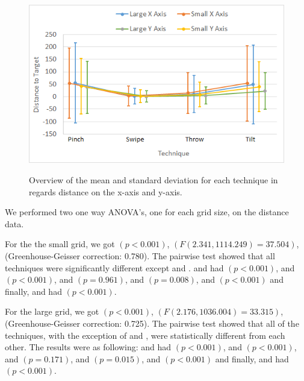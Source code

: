 \begin{figure}[H]
	{\includegraphics[width = 1\columnwidth ]{images/distance_axis.png}} 
	\caption{
		Overview of the mean and standard deviation for each technique in regards distance on the x-axis and y-axis.
	}
	\label{fig:distanceXYResults}
\end{figure}

We performed two one way ANOVA's, one for each grid size, on the distance data.

For the the small grid, we got $(p<0.001)$, $(F(2.341, 1114.249)=37.504)$, (Greenhouse-Geisser correction: 0.780).
The pairwise test showed that all techniques were significantly different except \pinch and \tilt. 
\pinch and \swipe had $(p < 0.001)$, 
\pinch and \throw $(p <0.001)$, 
\pinch and \tilt $(p = 0.961)$, 
\swipe and \throw $(p = 0.008)$, 
\swipe and \tilt $(p < 0.001)$ and finally, 
\throw and \tilt had $(p < 0.001)$. 

For the large grid, we got $(p<0.001)$, $(F(2.176, 1036.004)=33.315)$, (Greenhouse-Geisser correction: 0.725).
The pairwise test showed that all of the techniques, with the exception of \pinch and \tilt, were statistically different from each other. The results were as following: 
\pinch and \swipe had $(p < 0.001)$, 
\pinch and \throw $(p <0.001)$, 
\pinch and \tilt $(p = 0.171)$, 
\swipe and \throw $(p = 0.015)$, 
\swipe and \tilt $(p < 0.001)$ and finally, 
\throw and \tilt had $(p < 0.001)$. 


